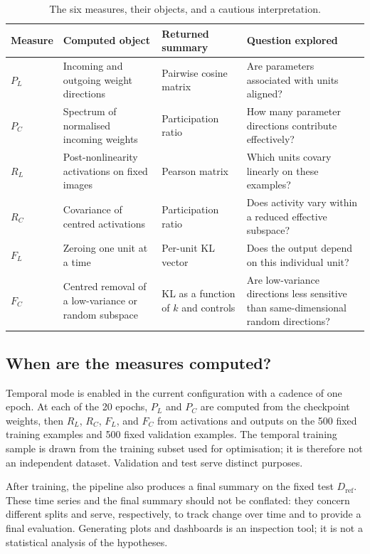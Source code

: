 \documentclass[11pt,a4paper]{article}
\begin{document}
\begin{table}[H]
    \centering
    \small
    \caption{The six measures, their objects, and a cautious interpretation.}
    \label{tab:measures}
    \begin{tabular}{@{}p{}p{}p{}p{}@{}}
        \toprule
        Measure & Computed object & Returned summary & Question explored \\
        \midrule
        $P_L$ & Incoming and outgoing weight directions & Pairwise cosine matrix & Are parameters associated with units aligned? \\
        $P_C$ & Spectrum of normalised incoming weights & Participation ratio & How many parameter directions contribute effectively? \\
        $R_L$ & Post-nonlinearity activations on fixed images & Pearson matrix & Which units covary linearly on these examples? \\
        $R_C$ & Covariance of centred activations & Participation ratio & Does activity vary within a reduced effective subspace? \\
        $F_L$ & Zeroing one unit at a time & Per-unit KL vector & Does the output depend on this individual unit? \\
        $F_C$ & Centred removal of a low-variance or random subspace & KL as a function of $k$ and controls & Are low-variance directions less sensitive than same-dimensional random directions? \\
        \bottomrule
    \end{tabular}
\end{table}

\subsection{When are the measures computed?}

Temporal mode is enabled in the current configuration with a cadence of one epoch. At each of the 20 epochs, $P_L$ and $P_C$ are computed from the checkpoint weights, then $R_L$, $R_C$, $F_L$, and $F_C$ from activations and outputs on the 500 fixed training examples and 500 fixed validation examples. The temporal training sample is drawn from the training subset used for optimisation; it is therefore not an independent dataset. Validation and test serve distinct purposes.

After training, the pipeline also produces a final summary on the fixed test $D_{\mathrm{ref}}$. These time series and the final summary should not be conflated: they concern different splits and serve, respectively, to track change over time and to provide a final evaluation. Generating plots and dashboards is an inspection tool; it is not a statistical analysis of the hypotheses.
\end{document}
